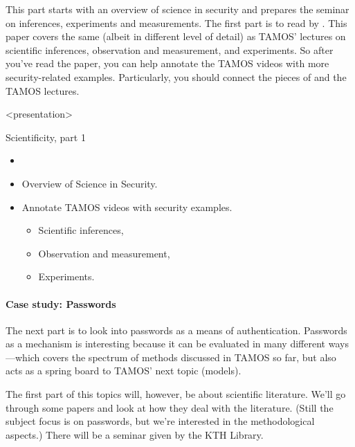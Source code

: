 This part starts with an overview of science in security and prepares the
seminar on inferences, experiments and measurements.
The first part is to read  by 
\textcite{HowToDesignSecurityExperiments}.
This paper covers the same (albeit in different level of detail) as TAMOS' 
lectures on
scientific inferences,
observation and measurement,
and experiments.
So after you've read the paper, you can help annotate the TAMOS videos with 
more security-related examples.
Particularly, you should connect the pieces of 
 and the TAMOS lectures.

\begin{frame}<presentation>
  \begin{block}{Scientificity, part 1}
    \begin{itemize}
      \item {}
      \item Overview of Science in Security.
      \item Annotate TAMOS videos with security examples.
        \begin{itemize}
          \item Scientific inferences,
          \item Observation and measurement,
          \item Experiments.
        \end{itemize}
    \end{itemize}
  \end{block}
\end{frame}

\paragraph{Case study: Passwords}

The next part is to look into passwords as a means of authentication.
Passwords as a mechanism is interesting because it can be evaluated in many 
different ways---which covers the spectrum of methods discussed in TAMOS so 
far, but also acts as a spring board to TAMOS' next topic (models).

The first part of this topics will, however, be about scientific literature.
We'll go through some papers and look at how they deal with the literature.
(Still the subject focus is on passwords, but we're interested in the 
methodological aspects.)
There will be a seminar given by the KTH Library.

